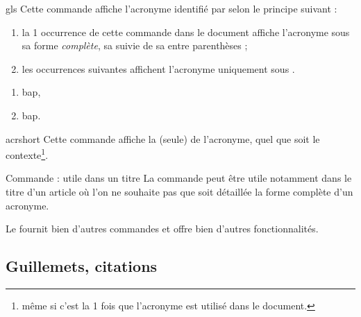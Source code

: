 \documentclass[english,nolocaltoc]{nwejmart}
\newtheorem[style=definition]{fait}
\newtheorem[title=expérience]{experience}
\newtheorem[title-plural=anneaux]{anneau}
\newtheorem[title=idéal,title-plural=idéaux]{ideal}
\begin{document}
\begin{docCommand}{gls}{}
  Cette commande affiche l'acronyme identifié par  selon le principe
  suivant :
  \begin{enumerate}
  \item la 1\iere{} occurrence de cette commande dans le document affiche
    l'acronyme sous sa forme \emph{complète}, \ie*{} sa 
    suivie de sa  entre parenthèses ;
  \item les occurrences suivantes affichent l'acronyme uniquement sous
    .
  \end{enumerate}
\end{docCommand}

\begin{preamblecode}[listing options={alsolanguage={[glossaries]TeX}}]
\end{preamblecode}
\begin{bodycode}[listing and text,listing options={alsolanguage={[glossaries]TeX}}]
\begin{enumerate}
\item \gls{bap},
\item \gls{bap}.
\end{enumerate}
\end{bodycode}

\begin{docCommand}{acrshort}{}
  Cette commande affiche la  (seule) de l'acronyme, quel que
  soit le contexte\footnote{\Ie*{} même si c'est la 1\iere{} fois que l'acronyme
    est utilisé dans le document.}.
\end{docCommand}

\begin{dbremark}{Commande  : utile dans un titre}{}
  La commande  peut être utile notamment dans le titre d'un
  article où l'on ne souhaite pas que soit détaillée la forme complète d'un
  acronyme.
\end{dbremark}

Le  fournit bien d'autres commandes et offre bien d'autres
fonctionnalités\autocite[Pour plus de détails, cf. par exemple][]{Bitouze7}.

\subsection{Guillemets, citations}
\label{sec-guillemets-citations}
\end{document}

